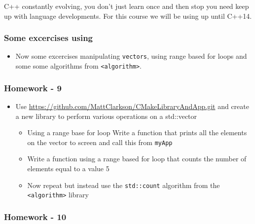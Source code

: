 C++ constantly evolving, you don't just learn once and then stop you
need keep up with language developments. For this course we will be
using up until C++14.

\hypertarget{some-excercises-using}{%
\subsubsection{Some excercises using}\label{some-excercises-using}}

\begin{itemize}
\tightlist
\item
  Now some excercises manipulating \texttt{vectors}, using range based
  for loops and some some algorithms from
  \texttt{\textless{}algorithm\textgreater{}}.
\end{itemize}

\hypertarget{homework---9}{%
\subsubsection{Homework - 9}\label{homework---9}}

\begin{itemize}
\tightlist
\item
  Use \url{https://github.com/MattClarkson/CMakeLibraryAndApp.git} and
  create a new library to perform various operations on a std::vector

  \begin{itemize}
  \tightlist
  \item
    Using a range base for loop Write a function that prints all the
    elements on the vector to screen and call this from \texttt{myApp}
  \item
    Write a function using a range based for loop that counts the number
    of elements equal to a value 5
  \item
    Now repeat but instead use the \texttt{std::count} algorithm from
    the \texttt{\textless{}algorithm\textgreater{}} library
  \end{itemize}
\end{itemize}

\hypertarget{homework---10}{%
\subsubsection{Homework - 10}\label{homework---10}}

